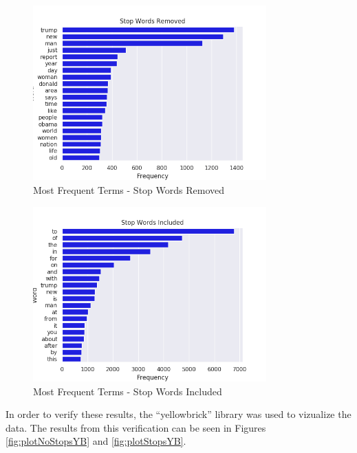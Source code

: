 \begin{figure}[H]
	\centering
	\includegraphics[width=0.8\textwidth]{images/stopWordsRemoved}
	\caption{Most Frequent Terms - Stop Words Removed}
	\label{fig:plotNoStops}
\end{figure}

\begin{figure}[H]
	\centering
	\includegraphics[width=0.8\textwidth]{images/stopWordsIncluded}
	\caption{Most Frequent Terms - Stop Words Included}
	\label{fig:plotStops}
\end{figure}

In order to verify these results, the ``yellowbrick'' library was used to
vizualize the data\cite{tfdYB}. The results from this verification can be seen in Figures
\ref{fig:plotNoStopsYB} and \ref{fig:plotStopsYB}.

